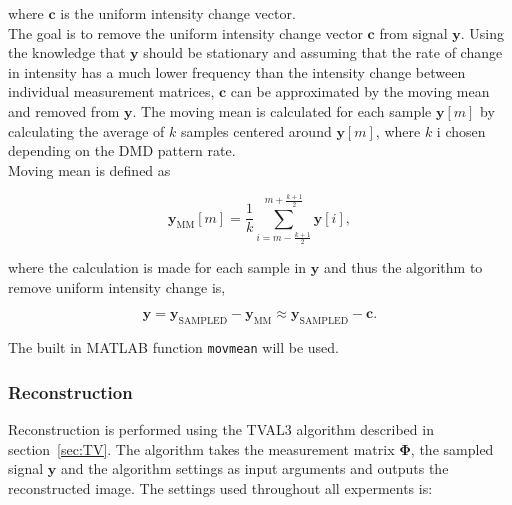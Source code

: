 where $\mathbf{c}$ is the uniform intensity change vector.\\[0.1in]

The goal is to remove the uniform intensity change vector $\mathbf{c}$ from signal $\mathbf{y}$. Using the knowledge that $\mathbf{y}$ should be stationary and assuming that the rate of change in intensity has a much lower frequency than the intensity change between individual measurement matrices, $\mathbf{c}$ can be approximated by the moving mean and removed from $\mathbf{y}$. The moving mean is calculated for each sample $\mathbf{y}[m]$ by calculating the average of $k$ samples centered around $\mathbf{y}[m]$, where $k$ i chosen depending on the DMD pattern rate.\\[0.1in]

Moving mean is defined as

\begin{equation}
\mathbf{y}_{\text{MM}}[m] = \frac{1}{k} \sum_{i = m-\frac{k+1}{2}}^{m + \frac{k+1}{2}} \mathbf{y}[i],
\end{equation}   
		 
where the calculation is made for each sample in $\mathbf{y}$ and thus the algorithm to remove uniform intensity change is,

\begin{equation}
\mathbf{y} = \mathbf{y}_{\text{SAMPLED}} - \mathbf{y}_{\text{MM}} \approx \mathbf{y}_{\text{SAMPLED}} -\mathbf{c}.
\end{equation}

The built in MATLAB function \texttt{movmean} will be used.
		 
%

\subsubsection{Reconstruction}
Reconstruction is performed using the TVAL3 algorithm described in section~\ref{sec:TV}. The algorithm takes the measurement matrix $\mathbf{\Phi}$, the sampled signal $\mathbf{y}$ and the algorithm settings as input arguments and outputs the reconstructed image. The settings used throughout all experments is:

